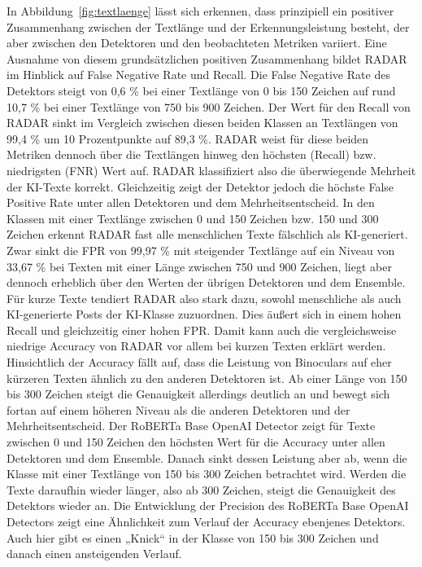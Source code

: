 In Abbildung~\ref{fig:textlaenge} lässt sich erkennen, dass prinzipiell ein positiver Zusammenhang zwischen der Textlänge und der Erkennungsleistung besteht, der aber zwischen den Detektoren und den beobachteten Metriken variiert. Eine Ausnahme von  diesem grundsätzlichen positiven Zusammenhang bildet RADAR im Hinblick auf False Negative Rate und Recall. Die False Negative Rate des Detektors steigt von 0,6 \% bei einer Textlänge von 0 bis 150 Zeichen auf rund 10,7 \% bei einer Textlänge von 750 bis 900 Zeichen. Der Wert für den Recall von RADAR sinkt im Vergleich zwischen diesen beiden Klassen an Textlängen von 99,4 \% um 10 Prozentpunkte auf 89,3 \%. RADAR weist für diese beiden Metriken dennoch über die Textlängen hinweg den höchsten (Recall) bzw. niedrigsten (FNR) Wert auf. RADAR klassifiziert also die überwiegende Mehrheit der KI-Texte korrekt. Gleichzeitig zeigt der Detektor jedoch die höchste False Positive Rate unter allen Detektoren und dem Mehrheitsentscheid. In den Klassen mit einer Textlänge zwischen 0 und 150 Zeichen bzw. 150 und 300 Zeichen erkennt RADAR fast alle menschlichen Texte fälschlich als KI-generiert. Zwar sinkt die FPR von 99,97 \% mit steigender Textlänge auf ein Niveau von 33,67 \% bei Texten mit einer Länge zwischen 750 und 900 Zeichen, liegt aber dennoch erheblich über den Werten der übrigen Detektoren und dem Ensemble.
Für kurze Texte tendiert RADAR also stark dazu, sowohl menschliche als auch KI-generierte Posts der KI-Klasse zuzuordnen. Dies äußert sich in einem hohen Recall und gleichzeitig einer hohen FPR.
Damit kann auch die vergleichsweise niedrige Accuracy von RADAR vor allem bei kurzen Texten erklärt werden.
Hinsichtlich der Accuracy fällt auf, dass die Leistung von Binoculars auf eher kürzeren Texten ähnlich zu den anderen Detektoren ist. Ab einer Länge von 150 bis 300 Zeichen steigt die Genauigkeit allerdings deutlich an und bewegt sich fortan auf einem höheren Niveau als die anderen Detektoren und der Mehrheitsentscheid.
Der RoBERTa Base OpenAI Detector zeigt für Texte zwischen 0 und 150 Zeichen den höchsten Wert für die Accuracy unter allen Detektoren und dem Ensemble. Danach sinkt dessen Leistung aber ab, wenn die Klasse mit einer Textlänge von 150 bis 300 Zeichen betrachtet wird. Werden die Texte daraufhin wieder länger, also ab 300 Zeichen, steigt die Genauigkeit des Detektors wieder an. Die Entwicklung der Precision des RoBERTa Base OpenAI Detectors zeigt eine Ähnlichkeit zum Verlauf der Accuracy ebenjenes Detektors. Auch hier gibt es einen „Knick“ in der Klasse von 150 bis 300 Zeichen und danach einen ansteigenden Verlauf.
